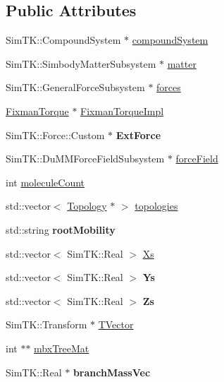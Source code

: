 \subsection*{Public Attributes}
\begin{DoxyCompactItemize}
\item 
Sim\+T\+K\+::\+Compound\+System $\ast$ \hyperlink{classWorld_a63269bd638b21445a78de794c97ee592}{compound\+System}
\item 
Sim\+T\+K\+::\+Simbody\+Matter\+Subsystem $\ast$ \hyperlink{classWorld_adc0da6db32a40c1cc09e29f7044ac3e6}{matter}
\item 
Sim\+T\+K\+::\+General\+Force\+Subsystem $\ast$ \hyperlink{classWorld_a25f41543a35f1950cde1e7a70a01d38d}{forces}
\item 
\hyperlink{classFixmanTorque}{Fixman\+Torque} $\ast$ \hyperlink{classWorld_a365134a878260d3e05efc93634b697df}{Fixman\+Torque\+Impl}
\item 
Sim\+T\+K\+::\+Force\+::\+Custom $\ast$ {\bfseries Ext\+Force}\hypertarget{classWorld_a32035c92ef74b9e8e91fedfdd152b112}{}\label{classWorld_a32035c92ef74b9e8e91fedfdd152b112}

\item 
Sim\+T\+K\+::\+Du\+M\+M\+Force\+Field\+Subsystem $\ast$ \hyperlink{classWorld_a49e379a00c0f908542349ee979775e8d}{force\+Field}
\item 
int \hyperlink{classWorld_a88ce5b19230917725b4c5656581d04e6}{molecule\+Count}
\item 
std\+::vector$<$ \hyperlink{classTopology}{Topology} $\ast$ $>$ \hyperlink{classWorld_aa0c16379fe096948946e73bd2a34bbb9}{topologies}
\item 
std\+::string {\bfseries root\+Mobility}\hypertarget{classWorld_afbe82ba1b4c10f2d034774c78fe1d36d}{}\label{classWorld_afbe82ba1b4c10f2d034774c78fe1d36d}

\item 
std\+::vector$<$ Sim\+T\+K\+::\+Real $>$ \hyperlink{classWorld_a0284a9971261c375fb04561a0f4821e6}{Xs}
\item 
std\+::vector$<$ Sim\+T\+K\+::\+Real $>$ {\bfseries Ys}\hypertarget{classWorld_afd6148945636421af67bf0967b3a1a1e}{}\label{classWorld_afd6148945636421af67bf0967b3a1a1e}

\item 
std\+::vector$<$ Sim\+T\+K\+::\+Real $>$ {\bfseries Zs}\hypertarget{classWorld_a34638c9fa524b941b8110d935ed79f32}{}\label{classWorld_a34638c9fa524b941b8110d935ed79f32}

\item 
Sim\+T\+K\+::\+Transform $\ast$ \hyperlink{classWorld_a615e5483cdea05073c6a9cde2a945433}{T\+Vector}
\item 
int $\ast$$\ast$ \hyperlink{classWorld_ae6ee20b37727cb29bbb29fa57e4b4ccc}{mbx\+Tree\+Mat}
\item 
Sim\+T\+K\+::\+Real $\ast$ {\bfseries branch\+Mass\+Vec}\hypertarget{classWorld_aa1e17875d970e2a5866dccbe92794408}{}\label{classWorld_aa1e17875d970e2a5866dccbe92794408}


\end{DoxyCompactItemize}
